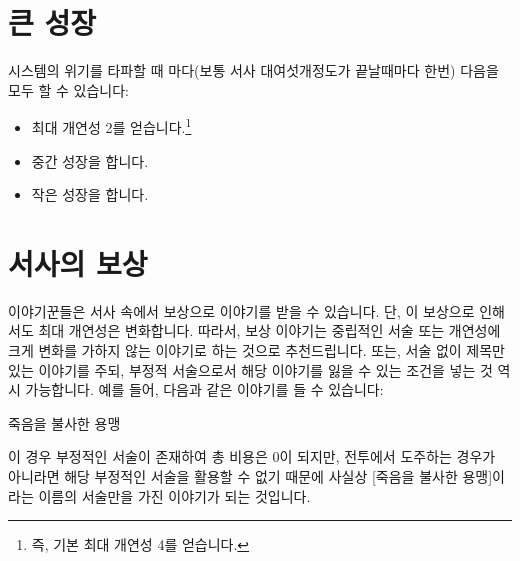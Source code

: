 \documentclass{report}
\begin{document}
	\section*{큰 성장}
	시스템의 위기를 타파할 때 마다(보통 서사 대여섯개정도가 끝날때마다 한번) 다음을 모두 할 수 있습니다:
	\begin{itemize}
		\item 최대 개연성 2를 얻습니다.\footnote{\label{lite-big-upgrade-cost}즉, 기본 최대 개연성 4를 얻습니다.}
		\item 중간 성장을 합니다.
		\item 작은 성장을 합니다.
	\end{itemize}
	
	\section*{서사의 보상}
	이야기꾼들은 서사 속에서 보상으로 이야기를 받을 수 있습니다. 단, 이 보상으로 인해서도 최대 개연성은 변화합니다. 따라서, 보상 이야기는 중립적인 서술 또는 개연성에 크게 변화를 가하지 않는 이야기로 하는 것으로 추천드립니다. 또는, 서술 없이 제목만 있는 이야기를 주되, 부정적 서술으로서 해당 이야기를 잃을 수 있는 조건을 넣는 것 역시 가능합니다. 예를 들어, 다음과 같은 이야기를 들 수 있습니다:
	
	\begin{lite}{죽음을 불사한 용맹}
	\end{lite}
	
	이 경우 부정적인 서술이 존재하여 총 비용은 0이 되지만, 전투에서 도주하는 경우가 아니라면 해당 부정적인 서술을 활용할 수 없기 때문에 사실상 [죽음을 불사한 용맹]이라는 이름의 서술만을 가진 이야기가 되는 것입니다.
\end{document}
